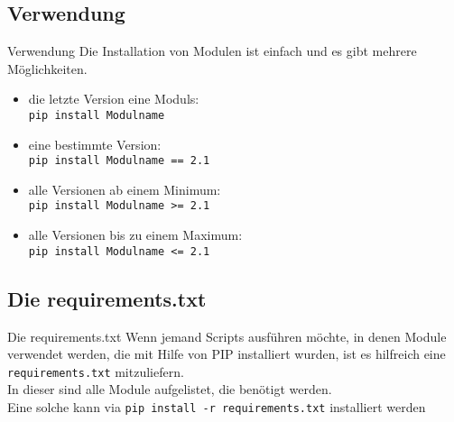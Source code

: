 \subsection{Verwendung}
\begin{frame}{Verwendung}
	Die Installation von Modulen ist einfach und es gibt mehrere Möglichkeiten.
	\begin{itemize}
		\item die letzte Version eine Moduls:\\
		\noindent\hspace*{.5cm} \texttt{pip install Modulname}
		\item eine bestimmte Version:\\
		\noindent\hspace*{.5cm} \texttt{pip install Modulname == 2.1}
		\item alle Versionen ab einem Minimum:\\
		\noindent\hspace*{.5cm} \texttt{pip install Modulname >= 2.1}
		\item alle Versionen bis zu einem Maximum:\\
		\noindent\hspace*{.5cm} \texttt{pip install Modulname <= 2.1}
	\end{itemize}
\end{frame}

\subsection{Die requirements.txt}
\begin{frame}{Die requirements.txt}
	Wenn jemand Scripts ausführen möchte, in denen Module verwendet werden, die mit Hilfe von PIP installiert wurden, ist es hilfreich eine \texttt{requirements.txt} mitzuliefern.\\
	In dieser sind alle Module aufgelistet, die benötigt werden.\\[.5cm]
	

	Eine solche kann via \texttt{pip install -r requirements.txt} installiert werden
\end{frame}


